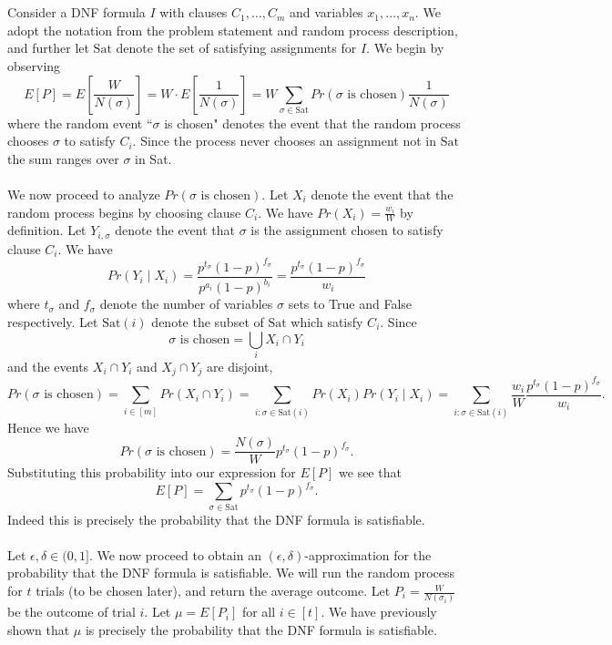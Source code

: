 \documentclass[letterpaper,12pt,oneside,onecolumn]{article}
\begin{document}
	\section{}
	\paragraph{}
	Consider a DNF formula $I$ with clauses $C_1, \dots, C_m$ and variables $x_1, \dots, x_n$. We adopt the notation from the problem statement and random process description, and further let $\text{Sat}$ denote the set of satisfying assignments for $I$. We begin by observing
	$$E[P] = E[\frac{W}{N(\sigma)}] = W\cdot E[\frac{1}{N(\sigma)}] = W\sum_{\sigma \in \text{Sat}} Pr(\sigma \text{ is chosen})\frac{1}{N(\sigma)}$$
	where the random event ``$\sigma$ is chosen" denotes the event that the random process chooses $\sigma$ to satisfy $C_i$. Since the process never chooses an assignment not in $\text{Sat}$ the sum ranges over $\sigma$ in Sat.
	\paragraph{}
	We now proceed to analyze $Pr(\sigma\text{ is chosen}).$ Let $X_i$ denote the event that the random process begins by choosing clause $C_i$. We have $Pr(X_i) = \frac{w_i}{W}$ by definition. Let $Y_{i,\sigma}$ denote the event that $\sigma$ is the assignment chosen to satisfy clause $C_i$. We have
	$$Pr(Y_i\mid X_i) = \frac{p^{t_\sigma}(1-p)^{f_\sigma}}{p^{a_i}(1-p)^{b_i}} = \frac{p^{t_\sigma}(1-p)^{f_\sigma}}{w_i}$$
	where $t_\sigma$ and $f_\sigma$ denote the number of variables $\sigma$ sets to True and False respectively. Let $\text{Sat}(i)$ denote the subset of $\text{Sat}$ which satisfy $C_i$. Since
	$$\sigma\text{ is chosen} = \bigcup_i X_i \cap Y_i$$
	and the events $X_i \cap Y_i$ and $X_j \cap Y_j$ are disjoint,
	$$Pr(\sigma\text{ is chosen}) = \sum_{i \in [m]}Pr(X_i \cap Y_i) = \sum_{i:\sigma \in \text{Sat}(i)} Pr(X_i)Pr(Y_i\mid X_i) = \sum_{i: \sigma \in \text{Sat}(i)} \frac{w_i}{W} \frac{p^{t_\sigma}(1-p)^{f_\sigma}}{w_i}.$$
	Hence we have
	$$Pr(\sigma\text{ is chosen}) = \frac{N(\sigma)}{W}p^{t_\sigma}(1-p)^{f_\sigma}.$$
	Substituting this probability into our expression for $E[P]$ we see that
	$$E[P] = \sum_{\sigma \in \text{Sat}}p^{t_\sigma}(1-p)^{f_\sigma}.$$
	Indeed this is precisely the probability that the DNF formula is satisfiable.
	\paragraph{}
	Let $\epsilon,\delta \in (0,1]$. We now proceed to obtain an $(\epsilon,\delta)$-approximation for the probability that the DNF formula is satisfiable. We will run the random process for $t$ trials (to be chosen later), and return the average outcome. Let $P_i = \frac{W}{N(\sigma_i)}$ be the outcome of trial $i$. Let $\mu = E[P_i]$ for all $i \in[t]$. We have previously shown that $\mu$ is precisely the probability that the DNF formula is satisfiable.
\end{document}
